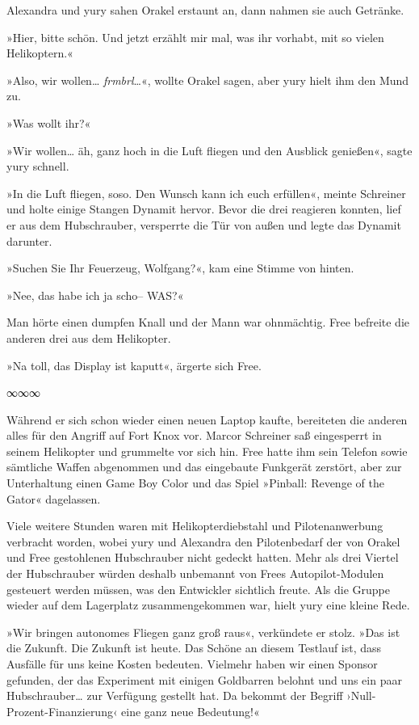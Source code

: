 Alexandra und yury sahen Orakel erstaunt an, dann nahmen sie auch Getränke.

»Hier, bitte schön. Und jetzt erzählt mir mal, was ihr vorhabt, mit so vielen Helikoptern.«

»Also, wir wollen… \textit{frmbrl}…«, wollte Orakel sagen, aber yury hielt ihm den Mund zu.

»Was wollt ihr?«

»Wir wollen… äh, ganz hoch in die Luft fliegen und den Ausblick genießen«, sagte yury schnell.

»In die Luft fliegen, soso. Den Wunsch kann ich euch erfüllen«, meinte Schreiner und holte einige Stangen Dynamit hervor. Bevor die drei reagieren konnten, lief er aus dem Hubschrauber, versperrte die Tür von außen und legte das Dynamit darunter.

»Suchen Sie Ihr Feuerzeug, Wolfgang?«, kam eine Stimme von hinten.

»Nee, das habe ich ja scho– WAS?«

Man hörte einen dumpfen Knall und der Mann war ohnmächtig. Free befreite die anderen drei aus dem Helikopter.

»Na toll, das Display ist kaputt«, ärgerte sich Free.

\begin{center}
    ∞∞∞
\end{center}

Während er sich schon wieder einen neuen Laptop kaufte, bereiteten die anderen alles für den Angriff auf Fort Knox vor. Marcor Schreiner saß eingesperrt in seinem Helikopter und grummelte vor sich hin. Free hatte ihm sein Telefon sowie sämtliche Waffen abgenommen und das eingebaute Funkgerät zerstört, aber zur Unterhaltung einen Game Boy Color und das Spiel »Pinball: Revenge of the Gator« dagelassen.

Viele weitere Stunden waren mit Helikopterdiebstahl und Pilotenanwerbung verbracht worden, wobei yury und Alexandra den Pilotenbedarf der von Orakel und Free gestohlenen Hubschrauber nicht gedeckt hatten. Mehr als drei Viertel der Hubschrauber würden deshalb unbemannt von Frees Autopilot-Modulen gesteuert werden müssen, was den Entwickler sichtlich freute. Als die Gruppe wieder auf dem Lagerplatz zusammengekommen war, hielt yury eine kleine Rede.

»Wir bringen autonomes Fliegen ganz groß raus«, verkündete er stolz. »Das ist die Zukunft. Die Zukunft ist heute. Das Schöne an diesem Testlauf ist, dass Ausfälle für uns keine Kosten bedeuten. Vielmehr haben wir einen Sponsor gefunden, der das Experiment mit einigen Goldbarren belohnt und uns ein paar Hubschrauber… zur Verfügung gestellt hat. Da bekommt der Begriff ›Null-Prozent-Finanzierung‹ eine ganz neue Bedeutung!«

